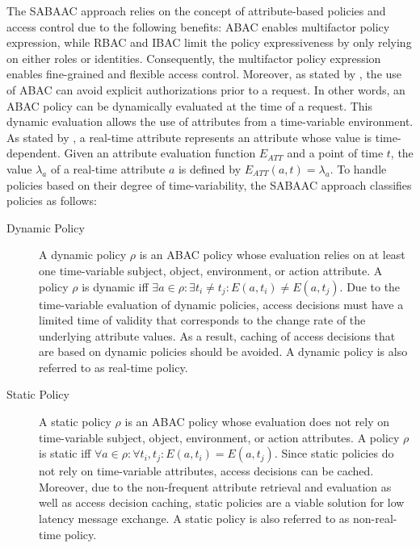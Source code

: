The SABAAC approach relies on the concept of attribute-based policies and access control due to the following benefits:
ABAC enables multifactor policy expression, while RBAC and IBAC limit the policy expressiveness by only relying on either roles or identities.
Consequently, the multifactor policy expression enables fine-grained and flexible access control.
Moreover, as stated by \citeauthor{Hu2014} \cite{Hu2014}, the use of ABAC can avoid explicit authorizations prior to a request.
In other words, an ABAC policy can be dynamically evaluated at the time of a request.
This dynamic evaluation allows the use of attributes from a time-variable environment.
As stated by \citeauthor{Burmester2013} \cite{Burmester2013}, a real-time attribute represents an attribute whose value is time-dependent.
Given an attribute evaluation function $E_{ATT}$ and a point of time $t$, the value $\lambda_a$ of a real-time attribute $a$ is defined by $E_{ATT}(a, t) = \lambda_a$.
To handle policies based on their degree of time-variability, the SABAAC approach classifies policies as follows:
\begin{description}
    \item[Dynamic Policy] A dynamic policy $\rho$ is an ABAC policy whose evaluation relies on at least one time-variable subject, object, environment, or action attribute.
    A policy $\rho$ is dynamic iff $\exists a \in \rho: \exists t_i \neq t_j: E(a,t_i) \neq E(a,t_j)$.
    Due to the time-variable evaluation of dynamic policies, access decisions must have a limited time of validity that corresponds to the change rate of the underlying attribute values.
    As a result, caching of access decisions that are based on dynamic policies should be avoided.
    A dynamic policy is also referred to as real-time policy.
    \item[Static Policy] A static policy $\rho$ is an ABAC policy whose evaluation does not rely on time-variable subject, object, environment, or action attributes.
    A policy $\rho$ is static iff $\forall a \in \rho: \forall t_i,t_j: E(a,t_i) = E(a,t_j)$.
    Since static policies do not rely on time-variable attributes, access decisions can be cached.
    Moreover, due to the non-frequent attribute retrieval and evaluation as well as access decision caching, static policies are a viable solution for low latency message exchange.
    A static policy is also referred to as non-real-time policy.
\end{description}

